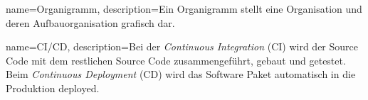 {
  name={Organigramm},
  description={Ein Organigramm stellt eine Organisation und deren Aufbauorganisation grafisch dar.}
}

{
  name={CI/CD},
  description={Bei der \emph{Continuous Integration} (CI) wird der Source Code mit dem restlichen Source Code zusammengeführt, gebaut und getestet.
      Beim \emph{Continuous Deployment} (CD) wird das Software Paket automatisch in die Produktion deployed.}
}
